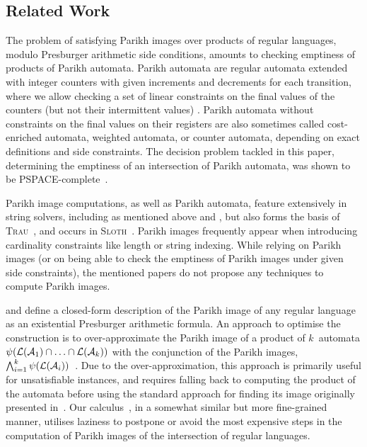 \subsection{Related Work}

The problem of satisfying Parikh images over products of regular
languages, modulo Presburger arithmetic side conditions,
amounts to checking emptiness of products of
Parikh automata. Parikh automata are regular automata extended with integer
counters with given increments and decrements for each transition, where we
allow checking a set of linear constraints on the final values of the counters
(but not their intermittent values) \cite{parikh-automata}. Parikh automata
without constraints on the final values on their registers are also sometimes
called cost-enriched automata, weighted automata, or counter automata, depending
on exact definitions and side constraints. The decision problem tackled in this
paper, determining the emptiness of an intersection of Parikh automata, was
shown to be PSPACE-complete~\cite{graph-queries}.

Parikh image computations, as well as Parikh automata, feature extensively in
string solvers, including as mentioned above \Ostrich{} and \OstrichPlus{}
\cite{ostrich,ostrich-plus}, but also forms the basis of
\textsc{Trau}~\cite{trau-pldi},
and occurs in \textsc{Sloth}~\cite{sloth}. Parikh images frequently appear when
introducing cardinality constraints like length or string indexing.
While relying on Parikh images (or on being able to check
the emptiness of Parikh images under given side constraints), the mentioned
papers do not propose any techniques to compute Parikh images.

\citeauthor{muscholl-linear} and \citeauthor{generate-parikh-image}
define a closed-form description of the Parikh image of any regular
language as an existential Presburger arithmetic formula.
%
An approach to optimise the construction is to
over-approximate the Parikh image of a product of $k$~automata
$\operatorname{\psi}(\operatorname{\mathcal{L}}(\mathcal{A}_1) \cap \ldots \cap \operatorname{\mathcal{L}}(\mathcal{A}_k))$
with the conjunction of the Parikh images, $\bigwedge_{i=1}^{k}
\operatorname{\psi}(\operatorname{\mathcal{L}}(\mathcal{A}_i))$~\cite{approximate-parikh}.
Due to the over-approximation,
this approach is primarily useful for unsatisfiable instances,
and requires falling back to computing the product of the automata before
using the standard approach for finding its image originally presented
in~\cite{generate-parikh-image}. Our calculus~\Calculus{}, in a somewhat
similar but more fine-grained manner, utilises laziness to postpone or
avoid the most expensive steps in the computation of Parikh images of
the intersection of regular languages.


